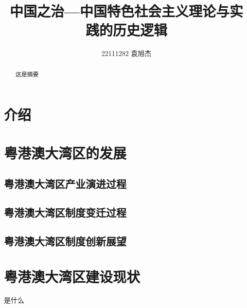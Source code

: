 \documentclass[UTF8]{article}
\title{中国之治—中国特色社会主义理论与实践的历史逻辑}
\author{22111282 袁旭杰}
\begin{document}
    \maketitle
    \rmfamily
    \mdseries\itshape
    \begin{abstract}
       这是摘要
    \end{abstract}
    \section{介绍}
    
    \section{粤港澳大湾区的发展}
    \subsection{粤港澳大湾区产业演进过程} 
    \subsection{粤港澳大湾区制度变迁过程}  
    \subsection{粤港澳大湾区制度创新展望}    
    \section{粤港澳大湾区建设现状} 
    \large 是什么\cite{WU19853}
    
    
\end{document}
